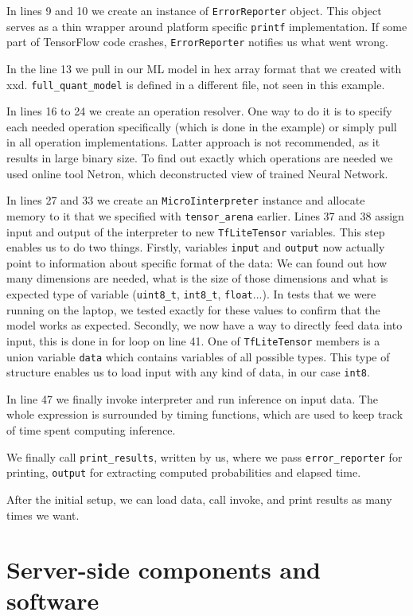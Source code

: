 In lines 9 and 10 we create an instance of \verb|ErrorReporter| object.
This object serves as a thin wrapper around platform specific \verb|printf| implementation.
If some part of TensorFlow code crashes, \verb|ErrorReporter| notifies us what went wrong.

In the line 13 we pull in our ML model in hex array format that we created with xxd.
\verb|full_quant_model| is defined in a different file, not seen in this example.

In lines 16 to 24 we create an operation resolver.
One way to do it is to specify each needed operation specifically (which is done in the example) or simply pull in all operation implementations.
Latter approach is not recommended, as it results in large binary size.
To find out exactly which operations are needed we used online tool Netron\cite{netron}, which deconstructed view of trained Neural Network.

In lines 27 and 33 we create an \verb|MicroIinterpreter| instance and allocate memory to it that we specified with \verb|tensor_arena| earlier.
Lines 37 and 38 assign input and output of the interpreter to new \verb|TfLiteTensor| variables.
This step enables us to do two things.
Firstly, variables \verb|input| and \verb|output| now actually point to information about specific format of the data: We can found out how many dimensions are needed, what is the size of those dimensions and what is expected type of variable (\verb|uint8_t|, \verb|int8_t|, \verb|float|...).
In tests that we were running on the laptop, we tested exactly for these values to confirm that the model works as expected.
Secondly, we now have a way to directly feed data into input, this is done in for loop on line 41.
One of \verb|TfLiteTensor| members is a union variable \verb|data| which contains variables of all possible types.
This type of structure enables us to load input with any kind of data, in our case \verb|int8|.

In line 47 we finally invoke interpreter and run inference on input data.
The whole expression is surrounded by timing functions, which are used to keep track of time spent computing inference.

We finally call \verb|print_results|, written by us, where we pass \verb|error_reporter| for printing, \verb|output| for extracting computed probabilities and elapsed time.

After the initial setup, we can load data, call invoke, and print results as many times we want.


\section{ Server-side components and software}

